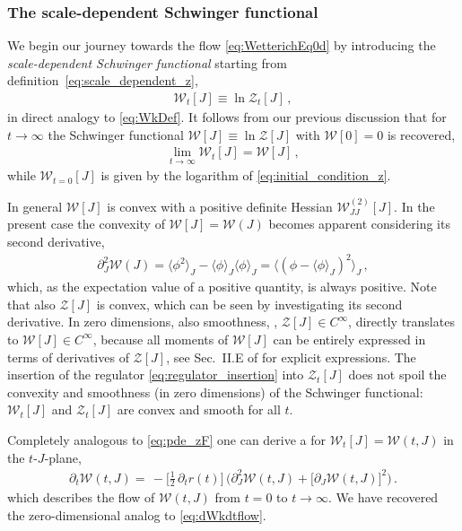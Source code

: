 \subsubsection{The scale-dependent Schwinger functional}
\label{subsubsec:WtJd0}
We begin our journey towards the \frg{} flow \cref{eq:WetterichEq0d} by introducing the \textit{scale-dependent Schwinger functional} starting from definition~\eqref{eq:scale_dependent_z},
\begin{align}
	\mathcal{W}_t [J] \equiv \ln \mathcal{Z}_t [J] \, ,	\label{eq:scale_dependent_w}
\end{align}
in direct analogy to \cref{eq:WkDef}.
It follows from our previous discussion that for $t \rightarrow \infty$ the Schwinger functional $\mathcal{W}[J] \equiv \ln \mathcal{Z}[J]$ with	$\mathcal{W} [ 0 ] = 0$ is recovered,
\begin{align}
	\lim\limits_{t \rightarrow \infty} \mathcal{W}_t [J] = \mathcal{W} [J] \, ,
\end{align}
while $\mathcal{W}_{t = 0} [J]$ is given by the logarithm of \cref{eq:initial_condition_z}.

In general $\mathcal{W}[J]$ is convex with a positive definite Hessian $\mathcal{W}^{(2)}_{J J} [ J ]$.
In the present case the convexity of $\mathcal{W} [ J ] = \mathcal{W} ( J )$ becomes apparent considering its second derivative,
\begin{align}
	\partial_J^2 \mathcal{W}(J) = \langle \phi^2 \rangle_J -\langle \phi \rangle_J \langle \phi \rangle_J= \langle (\phi-\langle \phi \rangle_J)^2\rangle_J \, ,	\label{eq:jacobian_w}
\end{align}
which, as the expectation value of a positive quantity, is always positive.
Note that also $\mathcal{Z}[J]$ is convex, which can be seen by investigating its second derivative.
In zero dimensions, also smoothness, \ie{}, $\mathcal{Z} [ J ] \in C^\infty$, directly translates to $\mathcal{W} [ J ] \in C^\infty$, because all moments of $\mathcal{W} [ J ]$ can be entirely expressed in terms of derivatives of $\mathcal{Z} [J]$, see Sec.~II.E of  for explicit expressions.
The insertion of the regulator \eqref{eq:regulator_insertion} into $\mathcal{Z}_t [J]$ does not spoil the convexity and smoothness (in zero dimensions) of the Schwinger functional: $\mathcal{W}_t [J]$ and $\mathcal{Z}_t [J]$ are convex and smooth for all $t$.

Completely analogous to \cref{eq:pde_zF} one can derive a \pde{} for $\mathcal{W}_t[J] = \mathcal{W}(t,J)$ in the $t$-$J$-plane,
\begin{align}
	\partial_t \mathcal{W}(t,J) =	\, - \big[ \tfrac{1}{2} \, \partial_t r ( t ) \big] \, \Big( \partial_J^2 \mathcal{W}(t,J) + \big[ \partial_J \mathcal{W}(t,J) \big]^2 \Big) \, .\label{eq:pde_w}
\end{align}
which describes the flow of $\mathcal{W}(t,J)$ from $t = 0$ to $t \rightarrow \infty$.
We have recovered the zero-dimensional analog to \cref{eq:dWkdtflow}.

